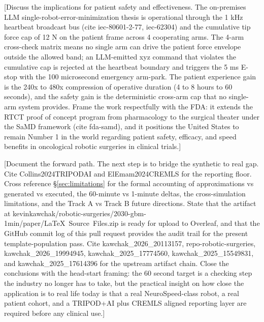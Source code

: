[Discuss the implications for patient safety and effectiveness. The
on-premises LLM single-robot-error-minimization thesis is operational
through the 1 kHz heartbeat broadcast bus (cite iec-80601-2-77,
iec-62304) and the cumulative tip force cap of 12 N on the patient
frame across 4 cooperating arms. The 4-arm cross-check matrix means
no single arm can drive the patient force envelope outside the
allowed band; an LLM-emitted xyz command that violates the cumulative
cap is rejected at the heartbeat boundary and triggers the 5 ms
E-stop with the 100 microsecond emergency arm-park. The patient
experience gain is the 240x to 480x compression of operative
duration (4 to 8 hours to 60 seconds), and the safety gain is the
deterministic cross-arm cap that no single-arm system provides.
Frame the work respectfully with the FDA: it extends the RTCT proof
of concept program from pharmacology to the surgical theater under
the SaMD framework (cite fda-samd), and it positions the United
States to remain Number 1 in the world regarding patient safety,
efficacy, and speed benefits in oncological robotic surgeries in
clinical trials.]

[Document the forward path. The next step is to bridge the synthetic
to real gap. Cite Collins2024TRIPODAI and ElEmam2024CREMLS for the
reporting floor. Cross reference \S\ref{sec:limitations} for the
formal accounting of approximations vs generated vs executed, the
60-minute vs 1-minute deltas, the cross-simulation limitations, and
the Track A vs Track B future directions. State that the artifact at
kevinkawchak/robotic-surgeries/2030-gbm-1min/paper/LaTeX\ Source\ Files.zip
is ready for upload to Overleaf, and that the GitHub commit log of
this pull request provides the audit trail for the present
template-population pass. Cite kawchak_2026_20113157,
repo-robotic-surgeries, kawchak_2026_19994945, kawchak_2025_17774560,
kawchak_2025_15549831, and kawchak_2025_17614396 for the upstream
artifact chain. Close the conclusions with the head-start framing:
the 60 second target is a checking step the industry no longer has
to take, but the practical insight on how close the application is
to real life today is that a real NeuroSpeed-class robot, a real
patient cohort, and a TRIPOD+AI plus CREMLS aligned reporting layer
are required before any clinical use.]
